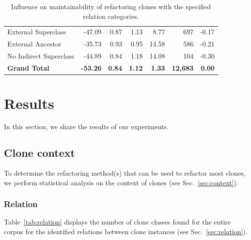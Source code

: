 \documentclass[sigconf,review, table]{acmart}
\begin{document}
\begin{table}
\begin{tabular}{@{}lrrrrrr@{}}
\hspace{10pt} External Superclass & -47.09 & 0.87 & 1.13 & 8.77 & 697 & -0.17 \\
\hspace{10pt} External Ancestor & -35.73 & 0.93 & 0.95 & 14.58 & 586 & -0.21 \\
\hspace{10pt} No Indirect Superclass & -44.89 & 0.84 & 1.18 & 14.08 & 104 & -0.30 \\ \midrule
\textbf{Grand Total} & \textbf{-53.26} & \textbf{0.84} & \textbf{1.12} & \textbf{1.33} & \textbf{12,683} & \textbf{0.00} \\ \bottomrule
\end{tabular}%
\caption{Influence on maintainability of refactoring clones with the specified relation categories.}
\label{tab:relation_refactor}
\end{table}


\section{Results}
In this section, we share the results of our experiments.

\subsection{Clone context}
To determine the refactoring method(s) that can be used to refactor most clones, we perform statistical analysis on the context of clones (see Sec.~\ref{sec:context}).

\subsubsection{Relation}
Table~\ref{tab:relation} displays the number of clone classes found for the entire corpus for the identified relations between clone instances (see Sec.~\ref{sec:relation}).
\end{document}
